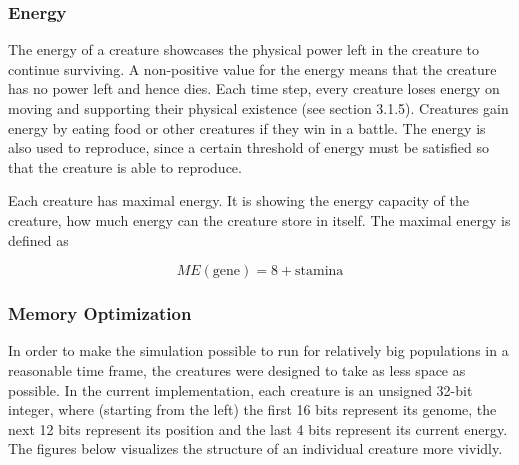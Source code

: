 \documentclass{article}
\begin{document}
\subsubsection{Energy}

The energy of a creature showcases the physical power left in the creature to continue surviving. A non-positive value for the energy means that the creature has no power left and hence dies. Each time step, every creature loses energy on moving and supporting their physical existence (see section 3.1.5). Creatures gain energy by eating food or other creatures if they win in a battle. The energy is also used to reproduce, since a certain threshold of energy must be satisfied so that the creature is able to reproduce.

Each creature has maximal energy. It is showing the energy capacity of the creature, how much energy can the creature store in itself. The maximal energy is defined as

\[
    ME(\text{gene}) = 8 + \text{stamina}
\]

\subsubsection{Memory Optimization}

In order to make the simulation possible to run for relatively big populations in a reasonable time frame, the creatures were designed to take as less space as possible. In the current implementation, each creature is an unsigned 32-bit integer, where (starting from the left) the first 16 bits represent its genome, the next 12 bits represent its position and the last 4 bits represent its current energy. The figures below visualizes the structure of an individual creature more vividly.
\end{document}
